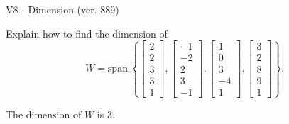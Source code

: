 \begin{exercise}
  \begin{exerciseTitle}V8 - Dimension (ver. 889)\end{exerciseTitle}
  \begin{exerciseStatement}
    Explain how to find the dimension of 
\[W=\mathrm{span}\ \left\{\left[\begin{array}{r}
2 \\
2 \\
3 \\
3 \\
1
\end{array}\right] , \left[\begin{array}{r}
-1 \\
-2 \\
2 \\
3 \\
-1
\end{array}\right] , \left[\begin{array}{r}
1 \\
0 \\
3 \\
-4 \\
1
\end{array}\right] , \left[\begin{array}{r}
3 \\
2 \\
8 \\
9 \\
1
\end{array}\right]\right\}.\]



  \end{exerciseStatement}
  \begin{exerciseAnswer}
   The dimension of \(W\) is  \(3\).
  


  \end{exerciseAnswer}
\end{exercise}